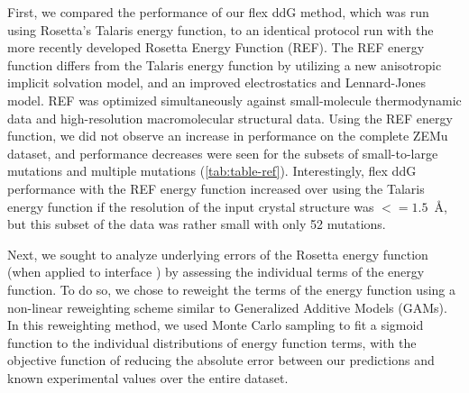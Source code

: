 First, we compared the performance of our flex ddG method, which was run using Rosetta's Talaris\cite{song_structure-guided_2011,shapovalov_smoothed_2011,omeara_combined_2015} energy function, to an identical protocol run with the more recently developed Rosetta Energy Function (REF)\cite{alford_rosetta_2017}.
The REF energy function differs from the Talaris energy function by utilizing a new anisotropic implicit solvation model, and an improved electrostatics and Lennard-Jones model. REF was optimized simultaneously against small-molecule thermodynamic data and high-resolution macromolecular structural data.
Using the REF energy function, we did not observe an increase in performance on the complete ZEMu dataset, and performance decreases were seen for the subsets of small-to-large mutations and multiple mutations (\cref{tab:table-ref}).
Interestingly, flex ddG performance with the REF energy function increased over using the Talaris energy function if the resolution of the input crystal structure was $<= 1.5$\ \AA, but this subset of the data was rather small with only 52 mutations.

Next, we sought to analyze underlying errors of the Rosetta energy function (when applied to interface \ddg) by assessing the individual terms of the energy function. To do so, we chose to reweight the terms of the energy function using a non-linear reweighting scheme similar to Generalized Additive Models (GAMs)\cite{hastie_generalized_1990}.
In this reweighting method, we used Monte Carlo sampling to fit a sigmoid function to the individual distributions of energy function terms, with the objective function of reducing the absolute error between our predictions and known experimental values over the entire dataset.

